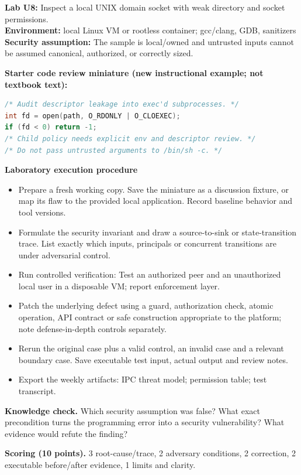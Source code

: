 \documentclass[10pt,letterpaper]{article}
\begin{document}
\begin{insight}\textbf{Lab U8:} Inspect a local UNIX domain socket with weak directory and socket permissions.\\\textbf{Environment:} local Linux VM or rootless container; gcc/clang, GDB, sanitizers\\\textbf{Security assumption:} The sample is local/owned and untrusted inputs cannot be assumed canonical, authorized, or correctly sized.\end{insight}
\textbf{Starter code review miniature (new instructional example; not textbook text):}
\begin{lstlisting}[language=C]
/* Audit descriptor leakage into exec'd subprocesses. */
int fd = open(path, O_RDONLY | O_CLOEXEC);
if (fd < 0) return -1;
/* Child policy needs explicit env and descriptor review. */
/* Do not pass untrusted arguments to /bin/sh -c. */
\end{lstlisting}
\textbf{Laboratory execution procedure}
\begin{itemize}[leftmargin=*,itemsep=2pt]
\item Prepare a fresh working copy. Save the miniature as a discussion fixture, or map its flaw to the provided local application. Record baseline behavior and tool versions.
\item Formulate the security invariant and draw a source-to-sink or state-transition trace. List exactly which inputs, principals or concurrent transitions are under adversarial control.
\item Run controlled verification: Test an authorized peer and an unauthorized local user in a disposable VM; report enforcement layer.
\item Patch the underlying defect using a guard, authorization check, atomic operation, API contract or safe construction appropriate to the platform; note defense-in-depth controls separately.
\item Rerun the original case plus a valid control, an invalid case and a relevant boundary case. Save executable test input, actual output and review notes.
\item Export the weekly artifacts: IPC threat model; permission table; test transcript.
\end{itemize}
\textbf{Knowledge check.} Which security assumption was false? What exact precondition turns the programming error into a security vulnerability? What evidence would refute the finding?

\textbf{Scoring (10 points).} 3 root-cause/trace, 2 adversary conditions, 2 correction, 2 executable before/after evidence, 1 limits and clarity.
\end{document}
